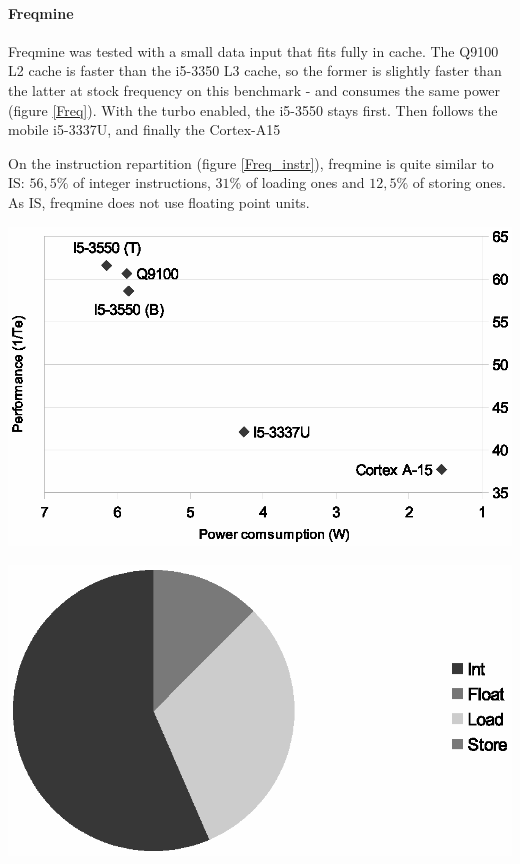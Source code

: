 \documentclass{article}
\newenvironment{Figure}
  {\par\medskip\noindent\center\minipage{0.9\linewidth}}
  {\endminipage\par\bigskip\medskip}
\begin{document}
\begin{multicols}{2}
\paragraph{Freqmine\\}
Freqmine was tested with a small data input that fits fully in cache. The Q9100 L2 cache is faster than the i5-3350 L3 cache, so the former is slightly faster than the latter at stock frequency on this benchmark - and consumes the same power (figure \ref{Freq}). With the turbo enabled, the i5-3550 stays first. Then follows the mobile i5-3337U, and finally the Cortex-A15

On the instruction repartition (figure \ref{Freq_instr}), freqmine is quite similar to IS: $56,5\%$ of integer instructions, $31\%$ of loading ones and $12,5\%$ of storing ones. As IS, freqmine does not use floating point units.

\begin{Figure}
\centering
\includegraphics[width=\linewidth]{Freqmine.eps}
\end{Figure}

\begin{Figure}
\centering
\includegraphics[width=\linewidth]{Freqmine_instr.eps}
\end{Figure}



\end{multicols}
\end{document}

